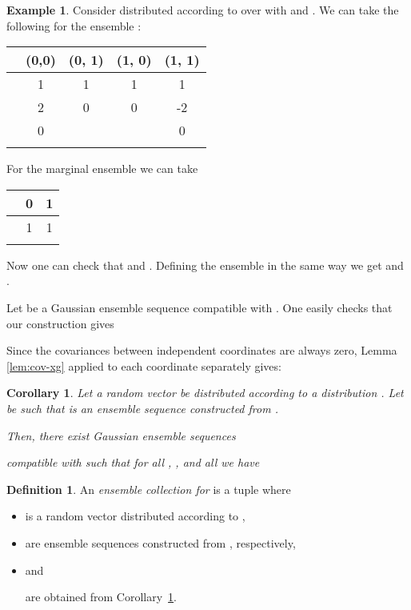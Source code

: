 \documentclass{daj}
\newcommand{\1}{\mathbbm{1}}
\theoremstyle{plain}
\newtheorem{corollary}[theorem]{Corollary}
\theoremstyle{definition}
\newtheorem{definition}[theorem]{Definition}
\newtheorem{example}[theorem]{Example}
\begin{document}
\begin{example}
Consider  distributed according to  
over  with
 and . We can take
the following for the ensemble :

\begin{tabular}{|l||c|c|c|c|}
\hline
 & (0,0) & (0, 1) & (1, 0) & (1, 1) 
\\ \hline \hline
 & 1 & 1 & 1 & 1
\\ \hline
 & 2 & 0 & 0 & -2
\\ \hline
 & 0 &  &  & 0
\\ \hline
 &  &  &  
                                                  & 
\\ \hline
\end{tabular}

For the marginal ensemble  we can take

\begin{tabular}{|l||c|c|}
\hline
 & 0 & 1 
\\ \hline \hline
 & 1 & 1
\\ \hline
 &  & 
\\ \hline
\end{tabular}

Now one can check that 
and 
. 
Defining the ensemble  in the same way we get
 and
.

Let  be a Gaussian ensemble sequence compatible with
. One easily checks that our construction gives

\end{example}

Since the covariances between independent coordinates are always zero,
Lemma \ref{lem:cov-xg} applied to each coordinate separately gives:
\begin{corollary}
\label{cor:cov-xg}
Let a random vector  be distributed according
to a distribution 
.
Let  be such
that  is an ensemble sequence constructed 
from .

Then, there exist Gaussian ensemble sequences
 
compatible with  such
that for all , , and all  we have

\end{corollary}

\begin{definition}
An \emph{ensemble collection for 
}
is a tuple 
where 
\begin{itemize}
\item  is a random vector
distributed according to ,
\item 

are ensemble sequences constructed from 
, respectively, 
\item and 

are obtained from Corollary~\ref{cor:cov-xg}.
\end{itemize}
\end{definition}
\end{document}
